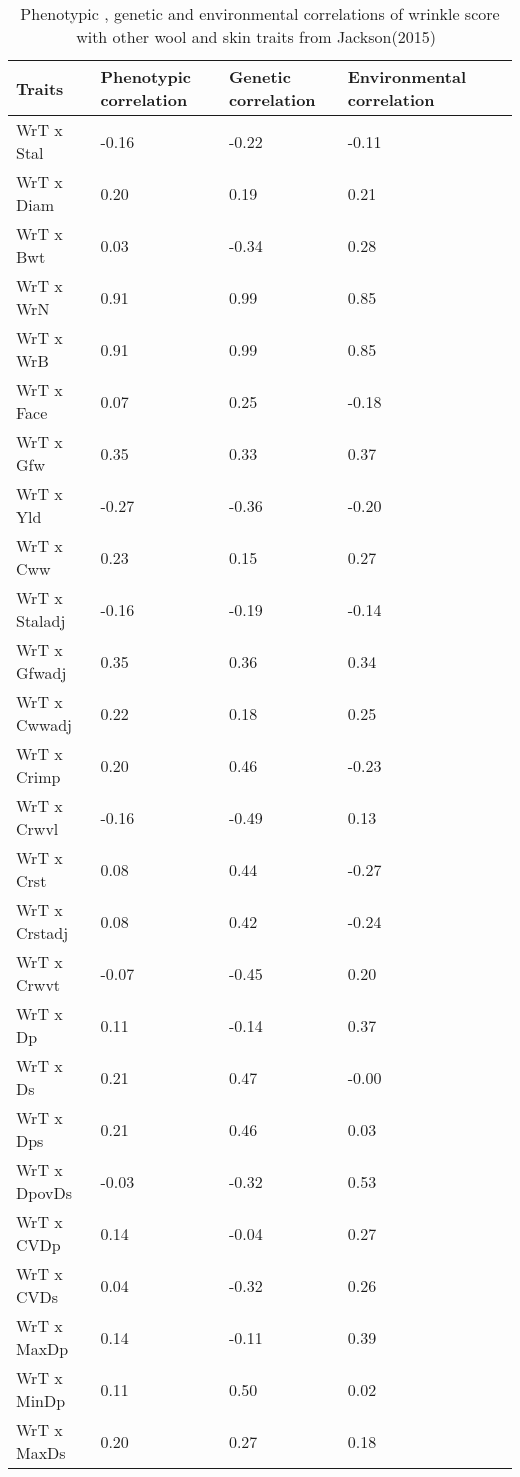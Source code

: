 %

\begin{table}[h]
\footnotesize
\centering
\caption{Phenotypic , genetic and environmental correlations of wrinkle score with other wool and skin traits from Jackson(2015)~\cite{jack:15}}
\label{tab:ab32}
\vspace{0.1in}
\begin{tabular}{|p{1.2in}|p{0.8in}|p{0.8in}|p{0.8in}|p{0.8in}|}  \hline
  Traits  & Phenotypic correlation  & Genetic correlation & Environmental correlation  \\  \hline
 WrT x Stal  & -0.16 & -0.22 & -0.11  \\
 WrT x Diam  & 0.20 & 0.19 & 0.21 \\
 WrT x Bwt  & 0.03 & -0.34 & 0.28 \\
 WrT x WrN & 0.91 & 0.99 & 0.85 \\ 
 WrT x WrB & 0.91 & 0.99 & 0.85 \\
 WrT x Face & 0.07 & 0.25 & -0.18 \\
 WrT x Gfw & 0.35 & 0.33 & 0.37 \\
 WrT x Yld & -0.27 & -0.36 & -0.20 \\
 WrT x Cww & 0.23 & 0.15 & 0.27 \\
 WrT x Staladj & -0.16 & -0.19 & -0.14 \\
 WrT x Gfwadj & 0.35 & 0.36 & 0.34 \\
 WrT x Cwwadj & 0.22 & 0.18 & 0.25 \\
 WrT x Crimp & 0.20 & 0.46 & -0.23 \\
 WrT x Crwvl & -0.16 & -0.49 & 0.13 \\
 WrT x Crst & 0.08 & 0.44 & -0.27 \\
 WrT x Crstadj & 0.08 & 0.42 & -0.24 \\
 WrT x Crwvt & -0.07 & -0.45 & 0.20 \\
 WrT x Dp & 0.11 & -0.14 & 0.37 \\
 WrT x Ds & 0.21 & 0.47 & -0.00 \\
 WrT x Dps & 0.21 & 0.46 & 0.03 \\
 WrT x DpovDs & -0.03 & -0.32 & 0.53 \\
 WrT x CVDp & 0.14 & -0.04 & 0.27 \\
 WrT x CVDs & 0.04 & -0.32 & 0.26 \\
 WrT x MaxDp & 0.14 & -0.11 & 0.39 \\
 WrT x MinDp & 0.11 & 0.50 & 0.02 \\
 WrT x MaxDs & 0.20 & 0.27 & 0.18 \\

\end{tabular}
\end{table}
